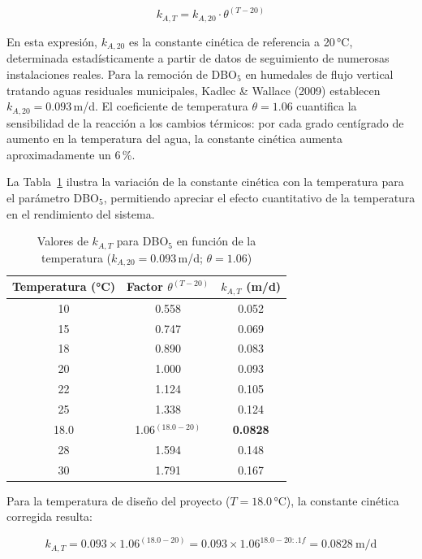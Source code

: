 \documentclass[12pt,a4paper]{article}
\begin{document}
\begin{equation}
k_{A,T} = k_{A,20} \cdot \theta^{(T-20)}
\label{eq:arrhenius}
\end{equation}

En esta expresión, $k_{A,20}$ es la constante cinética de referencia a 20\,°C, determinada estadísticamente a partir de datos de seguimiento de numerosas instalaciones reales. Para la remoción de DBO$_5$ en humedales de flujo vertical tratando aguas residuales municipales, Kadlec \& Wallace (2009) establecen $k_{A,20} = 0.093$\,m/d. El coeficiente de temperatura $\theta = 1.06$ cuantifica la sensibilidad de la reacción a los cambios térmicos: por cada grado centígrado de aumento en la temperatura del agua, la constante cinética aumenta aproximadamente un 6\,\%.

La Tabla~\ref{tab:kAT_temperatura} ilustra la variación de la constante cinética con la temperatura para el parámetro DBO$_5$, permitiendo apreciar el efecto cuantitativo de la temperatura en el rendimiento del sistema.

\begin{table}[H]
\centering
\caption{Valores de $k_{A,T}$ para DBO$_5$ en función de la temperatura ($k_{A,20} = 0.093$\,m/d; $\theta = 1.06$)}
\label{tab:kAT_temperatura}
\begin{tabular}{ccc}
\toprule
\textbf{Temperatura (°C)} & \textbf{Factor $\theta^{(T-20)}$} & \textbf{$k_{A,T}$ (m/d)} \\
\midrule
10 & 0.558 & 0.052 \\
15 & 0.747 & 0.069 \\
18 & 0.890 & 0.083 \\
20 & 1.000 & 0.093 \\
22 & 1.124 & 0.105 \\
25 & 1.338 & 0.124 \\
18.0 & 1.06$^{(18.0-20)}$ & \textbf{0.0828} \\
28 & 1.594 & 0.148 \\
30 & 1.791 & 0.167 \\
\bottomrule
\end{tabular}
\end{table}

Para la temperatura de diseño del proyecto ($T = 18.0$\,°C), la constante cinética corregida resulta:

\begin{equation}
k_{A,T} = 0.093 \times 1.06^{(18.0 - 20)} = 0.093 \times 1.06^{18.0 - 20:.1f} = 0.0828\ \text{m/d}
\end{equation}
\end{document}
